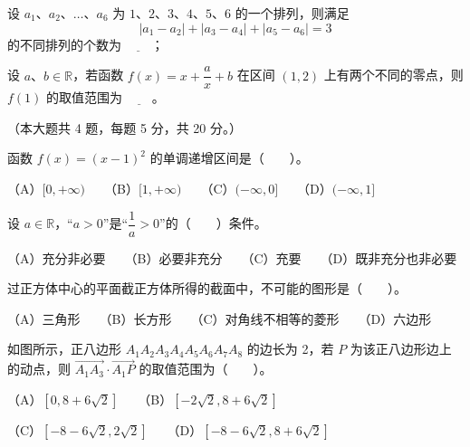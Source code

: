 \begin{question}
设 $a_1\text{、}a_2\text{、}\ldots\text{、}a_6$ 为 $1\text{、}2\text{、}3\text{、}4\text{、}5\text{、}6$ 的一个排列，则满足
\nopagebreak[4]
\[
|a_1-a_2|+|a_3-a_4|+|a_5-a_6|=3
\]
的不同排列的个数为 $\underline{\qquad}$；

\end{question}
\begin{question}
设 $a\text{、}b\in\mathbb R$，若函数 $f(x)=x+\dfrac ax+b$ 在区间 $(1,2)$ 上有两个不同的零点，则 $f(1)$ 的取值范围为 $\underline{\qquad}$。

\end{question}

（本大题共 4 题，每题 5 分，共 20 分。）

\begin{question}
函数 $f(x)=(x-1)^2$ 的单调递增区间是\mbox{（　　）}。

（A）$[0,+\infty)$　　（B）$[1,+\infty)$　　（C）$(-\infty,0]$　　（D）$(-\infty,1]$

\end{question}
\begin{question}
设 $a\in\mathbb R$，“$a>0$”是“$\dfrac1a>0$”的\mbox{（　　）}条件。

（A）充分非必要　　（B）必要非充分　　（C）充要　　（D）既非充分也非必要

\end{question}
\begin{question}
过正方体中心的平面截正方体所得的截面中，不可能的图形是\mbox{（　　）}。

（A）三角形　　（B）长方形　　（C）对角线不相等的菱形　　（D）六边形

\Needspace{0.4\textheight}
\end{question}
\begin{question}
如图所示，正八边形 $A_1A_2A_3A_4A_5A_6A_7A_8$ 的边长为 2，若 $P$ 为该正八边形边上的动点，则 $\overrightarrow{A_1A_3}\cdot\overrightarrow{A_1P}$ 的取值范围为\mbox{（　　）}。
\nopagebreak[4]
\begin{center}\end{center}
\nopagebreak[4]
（A）$[0,8+6\sqrt2]$　　（B）$[-2\sqrt2,8+6\sqrt2]$

（C）$[-8-6\sqrt2,2\sqrt2]$　　（D）$[-8-6\sqrt2,8+6\sqrt2]$

\end{question}

